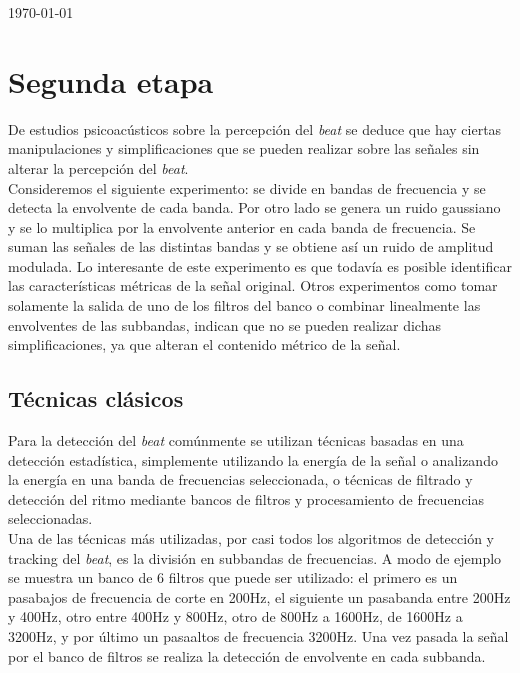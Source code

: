 \documentclass[12pt,a4paper,titlepage]{report}
\begin{document}
\begin{titlepage}
\begin{center}
{\large \today}
\end{center}
\end{titlepage}

\chapter*{Segunda etapa}

De estudios psicoacústicos sobre la percepción del \emph{beat} se deduce que hay ciertas manipulaciones y simplificaciones que se pueden realizar sobre las señales sin alterar la percepción del \emph{beat}.\\

Consideremos el siguiente experimento: se divide en bandas de frecuencia y se detecta la envolvente de cada banda. Por otro lado se genera un ruido gaussiano y se lo multiplica por la envolvente anterior en cada banda de frecuencia. Se suman las señales de las distintas bandas y se obtiene así un ruido de amplitud modulada. Lo interesante de este experimento es que todavía es posible identificar las características métricas de la señal original. Otros experimentos como tomar solamente la salida de uno de los filtros del banco o combinar linealmente las envolventes de las subbandas, indican que no se pueden realizar dichas simplificaciones, ya que alteran el contenido métrico de la señal.

\section*{Técnicas clásicos}

Para la detección del \emph{beat} comúnmente se utilizan técnicas basadas en una detección estadística, simplemente utilizando la energía de la señal o analizando la energía en una banda de frecuencias seleccionada, o técnicas de filtrado y detección del ritmo mediante bancos de filtros y procesamiento de frecuencias seleccionadas.\\

Una de las técnicas más utilizadas, por casi todos los algoritmos de detección y tracking del \emph{beat}, es la división en subbandas de frecuencias. A modo de ejemplo se muestra un banco de 6 filtros que puede ser utilizado: el primero es un pasabajos de frecuencia de corte en 200Hz, el siguiente un pasabanda entre 200Hz y 400Hz, otro entre 400Hz y 800Hz, otro de 800Hz a 1600Hz, de 1600Hz a 3200Hz, y por último un pasaaltos de frecuencia 3200Hz. Una vez pasada la señal por el banco de filtros se realiza la detección de envolvente en cada subbanda.\\
\end{document}
